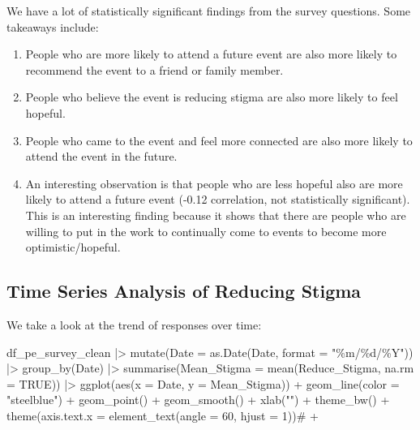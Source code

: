 \documentclass[
  letterpaper,
  DIV=11,
  numbers=noendperiod]{scrartcl}
\newenvironment{Shaded}{\begin{snugshade}}{\end{snugshade}}
\newcommand{\AttributeTok}[1]{\textcolor[rgb]{0.40,0.45,0.13}{#1}}
\newcommand{\CommentTok}[1]{\textcolor[rgb]{0.37,0.37,0.37}{#1}}
\newcommand{\ConstantTok}[1]{\textcolor[rgb]{0.56,0.35,0.01}{#1}}
\newcommand{\DecValTok}[1]{\textcolor[rgb]{0.68,0.00,0.00}{#1}}
\newcommand{\FunctionTok}[1]{\textcolor[rgb]{0.28,0.35,0.67}{#1}}
\newcommand{\NormalTok}[1]{\textcolor[rgb]{0.00,0.23,0.31}{#1}}
\newcommand{\SpecialCharTok}[1]{\textcolor[rgb]{0.37,0.37,0.37}{#1}}
\newcommand{\StringTok}[1]{\textcolor[rgb]{0.13,0.47,0.30}{#1}}
\providecommand{\tightlist}{%
  \setlength{\itemsep}{0pt}\setlength{\parskip}{0pt}}\usepackage{longtable,booktabs,array}
\begin{document}
We have a lot of statistically significant findings from the survey
questions. Some takeaways include:

\begin{enumerate}
\def\labelenumi{\arabic{enumi}.}
\tightlist
\item
  People who are more likely to attend a future event are also more
  likely to recommend the event to a friend or family member.
\item
  People who believe the event is reducing stigma are also more likely
  to feel hopeful.
\item
  People who came to the event and feel more connected are also more
  likely to attend the event in the future.
\item
  An interesting observation is that people who are less hopeful also
  are more likely to attend a future event (-0.12 correlation, not
  statistically significant). This is an interesting finding because it
  shows that there are people who are willing to put in the work to
  continually come to events to become more optimistic/hopeful.
\end{enumerate}

\hypertarget{time-series-analysis-of-reducing-stigma}{%
\subsection{Time Series Analysis of Reducing
Stigma}\label{time-series-analysis-of-reducing-stigma}}

We take a look at the trend of responses over time:

\begin{Shaded}
\begin{Highlighting}[]
\NormalTok{df\_pe\_survey\_clean }\SpecialCharTok{|\textgreater{}}
  \FunctionTok{mutate}\NormalTok{(}\AttributeTok{Date =} \FunctionTok{as.Date}\NormalTok{(Date, }\AttributeTok{format =} \StringTok{"\%m/\%d/\%Y"}\NormalTok{)) }\SpecialCharTok{|\textgreater{}}
  \FunctionTok{group\_by}\NormalTok{(Date) }\SpecialCharTok{|\textgreater{}}
  \FunctionTok{summarise}\NormalTok{(}\AttributeTok{Mean\_Stigma =} \FunctionTok{mean}\NormalTok{(Reduce\_Stigma, }\AttributeTok{na.rm =} \ConstantTok{TRUE}\NormalTok{)) }\SpecialCharTok{|\textgreater{}}
  \FunctionTok{ggplot}\NormalTok{(}\FunctionTok{aes}\NormalTok{(}\AttributeTok{x =}\NormalTok{ Date, }\AttributeTok{y =}\NormalTok{ Mean\_Stigma)) }\SpecialCharTok{+}
  \FunctionTok{geom\_line}\NormalTok{(}\AttributeTok{color =} \StringTok{"steelblue"}\NormalTok{) }\SpecialCharTok{+}
  \FunctionTok{geom\_point}\NormalTok{() }\SpecialCharTok{+}
  \FunctionTok{geom\_smooth}\NormalTok{() }\SpecialCharTok{+}
  \FunctionTok{xlab}\NormalTok{(}\StringTok{""}\NormalTok{) }\SpecialCharTok{+}
  \FunctionTok{theme\_bw}\NormalTok{() }\SpecialCharTok{+}
  \FunctionTok{theme}\NormalTok{(}\AttributeTok{axis.text.x =} \FunctionTok{element\_text}\NormalTok{(}\AttributeTok{angle =} \DecValTok{60}\NormalTok{, }\AttributeTok{hjust =} \DecValTok{1}\NormalTok{))}\CommentTok{\# +}
\end{Highlighting}
\end{Shaded}
\end{document}
